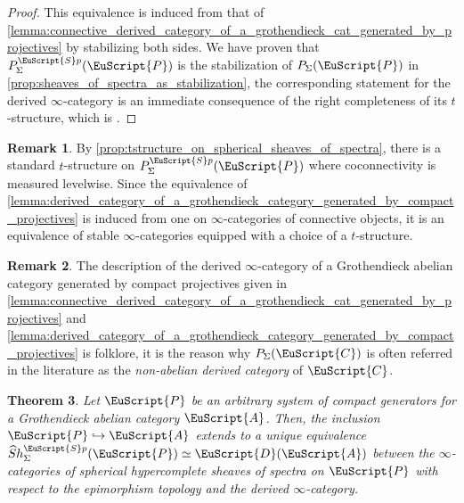 \documentclass[oneside,a4paper]{amsart}
\newcommand{\euscr}[1]{\EuScript{#1}} %
\newcommand{\acat}{\euscr{A}} %
\newcommand{\ccat}{\euscr{C}} %
\newcommand{\dcat}{\euscr{D}} %
\newcommand{\pcat}{\euscr{P}} %
\newcommand{\spectra}{\euscr{S}p} %
\newcommand{\hpsheaves}{\widehat{S}h} %
\newcommand{\hpssheavesofspectra}{\hpsheaves_{\Sigma}^{\spectra}} %
\theoremstyle{plain}
\newtheorem{thm}{Theorem}[section]
\theoremstyle{definition}
\newtheorem{rem}[thm]{Remark}
\theoremstyle{remark}
\begin{document}
\begin{proof}
This equivalence is induced from that of \cref{lemma:connective_derived_category_of_a_grothendieck_cat_generated_by_projectives} by stabilizing both sides. We have proven that $P_{\Sigma}^{\spectra}(\pcat)$ is the stabilization of $P_{\Sigma}(\pcat)$ in \cref{prop:sheaves_of_spectra_as_stabilization}, the corresponding statement for the derived $\infty$-category is an immediate consequence of the right completeness of its $t$-structure, which is \cite[1.3.5.21]{higher_algebra}.
\end{proof}

\begin{rem}
By \cref{prop:tstructure_on_spherical_sheaves_of_spectra}, there is a standard $t$-structure on $P_{\Sigma}^{\spectra}(\pcat)$ where coconnectivity is measured levelwise. Since the equivalence of \cref{lemma:derived_category_of_a_grothendieck_category_generated_by_compact_projectives} is induced from one on $\infty$-categories of connective objects, it is an equivalence of stable $\infty$-categories equipped with a choice of a $t$-structure. 
\end{rem}

\begin{rem}
The description of the derived $\infty$-category of a Grothendieck abelian category generated by compact projectives given in \cref{lemma:connective_derived_category_of_a_grothendieck_cat_generated_by_projectives} and \cref{lemma:derived_category_of_a_grothendieck_category_generated_by_compact_projectives} is folklore, it is the reason why $P_{\Sigma}(\ccat)$ is often referred in the literature as the \emph{non-abelian derived category} of $\ccat$.
\end{rem}

\begin{thm}
\label{thm:derived_category_of_a_cg_grothendieck_abelian_category}
Let $\pcat$ be an arbitrary system of compact generators for a Grothendieck abelian category $\acat$. Then, the inclusion $\pcat \hookrightarrow \acat$ extends to a unique equivalence $\hpssheavesofspectra(\pcat) \simeq \dcat(\acat)$ between the $\infty$-categories of spherical hypercomplete sheaves of spectra on $\pcat$ with respect to the epimorphism topology and the derived $\infty$-category.
\end{thm}
\end{document}
